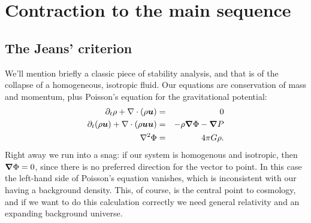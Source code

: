 \chapter{Contraction to the main sequence}

\section{The Jeans' criterion}

We'll mention briefly a classic piece of stability analysis, and that is of the collapse of a homogeneous, isotropic fluid. Our equations are conservation of mass and momentum, plus Poisson's equation for the gravitational potential:
\begin{eqnarray}
\partial_{t}\rho + \nabla \cdot(\rho \boldsymbol{u}) &=& 0\label{e.jeans-mass-cons}\\
\partial_{t}(\rho\boldsymbol{u}) + \nabla \cdot(\rho\boldsymbol{u}\boldsymbol{u}) &=& - \rho \boldsymbol{\nabla}\Phi - \boldsymbol{\nabla} P\label{e.jeans-momentum}\\
\nabla^{2} \Phi &=& 4\pi G \rho\label{e.jeans-poisson}.
\end{eqnarray}
Right away we run into a snag: if our system is homogenous and isotropic, then $\boldsymbol{\nabla}\Phi = 0$, since there is no preferred direction for the vector to point. In this case the left-hand side of Poisson's equation vanishes, which is inconsistent with our having a background density.  This, of course, is the central point to cosmology, and if we want to do this calculation correctly we need general relativity and an expanding background universe. 

